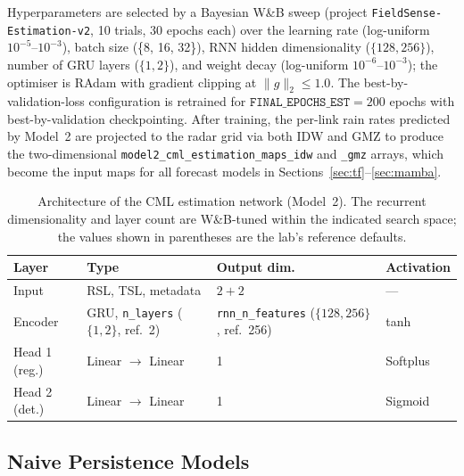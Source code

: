 \documentclass[12pt, a4paper]{article}
\begin{document}
Hyperparameters are selected by a Bayesian W\&B sweep
(project \texttt{FieldSense-Estimation-v2}, 10 trials, 30 epochs each)
over the learning rate (log-uniform \(10^{-5}\)--\(10^{-3}\)), batch
size (\{8, 16, 32\}), RNN hidden dimensionality (\(\{128, 256\}\)),
number of GRU layers (\(\{1, 2\}\)), and weight decay (log-uniform
\(10^{-6}\)--\(10^{-3}\)); the optimiser is RAdam with gradient
clipping at \(\lVert g\rVert_2 \le 1.0\). The best-by-validation-loss
configuration is retrained for \(\texttt{FINAL\_EPOCHS\_EST} = 200\)
epochs with best-by-validation checkpointing. After training, the
per-link rain rates predicted by Model~2 are projected to the radar
grid via both IDW and GMZ to produce the two-dimensional
\texttt{model2\_cml\_estimation\_maps\_idw} and
\texttt{\_gmz} arrays, which become the input maps for all forecast
models in Sections~\ref{sec:tf}--\ref{sec:mamba}.

\begin{table}[h]
\centering
\caption{Architecture of the CML estimation network (Model~2). The
recurrent dimensionality and layer count are W\&B-tuned within the
indicated search space; the values shown in parentheses are the lab's
reference defaults.}
\label{tab:model2_arch}
\begin{tabular}{llll}
\toprule
Layer & Type & Output dim. & Activation \\
\midrule
Input  & RSL, TSL, metadata           & \(2 + 2\)                  & --- \\
Encoder & GRU, \texttt{n\_layers} (\(\{1,2\}\), ref.~2) & \texttt{rnn\_n\_features} (\(\{128,256\}\), ref.~256) & tanh \\
Head 1 (reg.) & Linear $\rightarrow$ Linear & 1 & Softplus \\
Head 2 (det.) & Linear $\rightarrow$ Linear & 1 & Sigmoid \\
\bottomrule
\end{tabular}
\end{table}

\subsection{Naive Persistence Models}\label{sec:naive}
\end{document}
